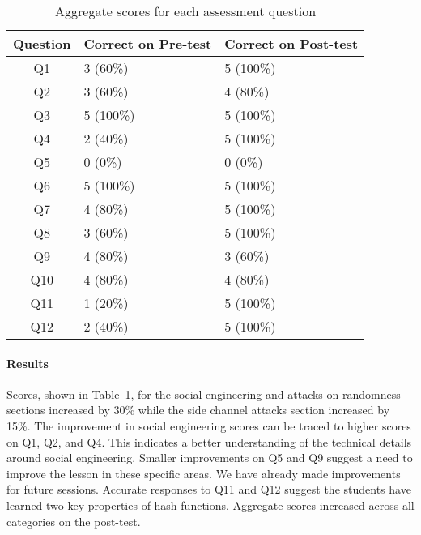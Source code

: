 \begin{table}
  \centering
  \scriptsize
  \begin{tabular}{c | l | l}
Question &  Correct on Pre-test   & Correct on Post-test \\
\hline
Q1   & 3 (60\%)  & 5 (100\%) \\
Q2   & 3 (60\%)  & 4 (80\%)  \\
Q3   & 5 (100\%) & 5 (100\%) \\
Q4   & 2 (40\%)  & 5 (100\%) \\
Q5   & 0 (0\%)   & 0 (0\%)   \\
Q6   & 5 (100\%) & 5 (100\%) \\
Q7   & 4 (80\%)  & 5 (100\%) \\
Q8   & 3 (60\%)  & 5 (100\%) \\
Q9   & 4 (80\%)  & 3 (60\%)  \\
Q10  & 4 (80\%)  & 4 (80\%)  \\
Q11  & 1 (20\%)  & 5 (100\%) \\
Q12  & 2 (40\%)  & 5 (100\%) \\
\end{tabular}

\caption{Aggregate scores for each assessment question}
\label{fig:results}
\end{table}

\paragraph{Results}
Scores, shown in Table~\ref{fig:results}, for the social engineering and attacks on randomness sections
increased by 30\% while the side channel attacks section increased by
15\%.
The improvement in social engineering scores can be traced to
higher scores on
Q1, Q2, and Q4.
This indicates a better understanding of the technical details
around social engineering.
Smaller improvements on Q5 and Q9 suggest a need to improve the lesson in
these specific areas.  We have already made improvements for future
sessions.
Accurate responses to Q11 and Q12
suggest the students have learned two
key properties of hash functions.
Aggregate scores increased across all categories on the post-test.





